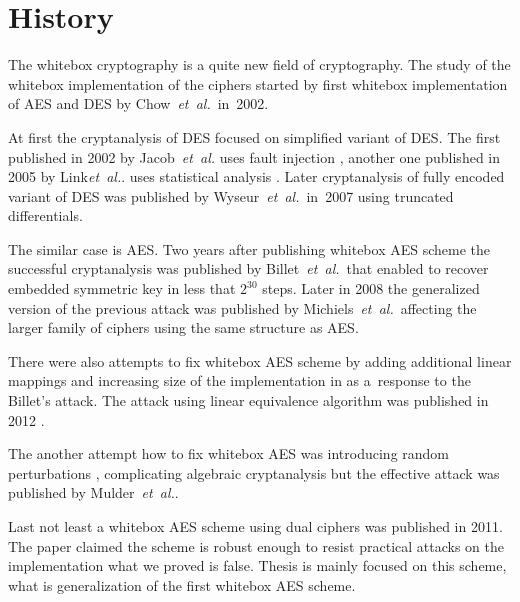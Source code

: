 \documentclass[11pt,oneside,final]{fithesis2}
\newcommand{\eal}{\emph{et~al.}}
\begin{document}
    \section{History}
    
    The whitebox cryptography is a quite new field of cryptography. The study of the whitebox implementation of the ciphers started by first 
    whitebox implementation of AES \citep{Chow02white-boxcryptography} and DES \citep{Chow02awhite-box} by Chow~\eal~in~2002. 
    
    At first the cryptanalysis of DES focused on simplified variant of DES. The first published in 2002 by Jacob~\eal
    uses fault injection \citep{conf/ccs/JacobBF02}, another one published in 2005 by Link\eal. uses statistical analysis \citep{Link:2005:COI:1058430.1059147}.
    Later cryptanalysis of fully encoded variant of DES was published by Wyseur~\eal~in~2007 using truncated differentials.
   
    The similar case is AES. Two years after publishing whitebox AES scheme the successful cryptanalysis \citep{Billet:2004:CWB:2080787.2080809} was
    published by Billet~\eal~that enabled to recover embedded symmetric 
    key in less that $2^{30}$ steps. Later in 2008 the generalized version of the previous attack
    was published \citep{Michiels:2007:MST:1314276.1314291} by Michiels~\eal~affecting the larger family of ciphers using the same structure as AES.   
   
    There were also attempts to fix whitebox AES scheme by adding additional linear mappings and increasing size of the implementation in \citep{XiaoLai}
    as a~response to the Billet's attack.
    The attack using linear equivalence algorithm was published in 2012 \cite{conf/sacrypt/MulderRP12}.
    
    The another attempt how to fix whitebox AES was introducing random perturbations \citep{journals/iacr/BringerCD06a}, 
    complicating algebraic cryptanalysis but the effective attack was published by Mulder~\eal \citep{conf/indocrypt/MulderWP10}.
    
    Last not least a whitebox AES scheme using dual ciphers \citep{Karroumi:2010:PWA:2041036.2041060} was published in 2011. The paper claimed 
    the scheme is robust enough to resist practical attacks on the implementation what we proved is false. 
    Thesis is mainly focused on this scheme, what is generalization of the first whitebox AES scheme. 
    
\end{document}
